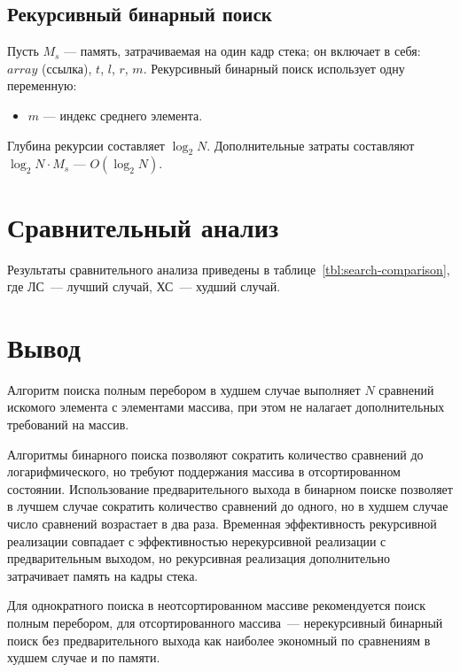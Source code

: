\subsection{Рекурсивный бинарный поиск}
Пусть $M_s$ --- память, затрачиваемая на один кадр стека; он включает в себя: $array$ (ссылка), $t$, $l$, $r$, $m$. 
Рекурсивный бинарный поиск использует одну переменную:
\begin{itemize}
	\item $m$ --- индекс среднего элемента.
\end{itemize}
Глубина рекурсии составляет $\log_2N$.
Дополнительные затраты составляют $\log_2N \cdot M_s$ --- $O(\log_2N)$.

\section{Сравнительный анализ}
Результаты сравнительного анализа приведены в таблице~\ref{tbl:search-comparison}, где ЛС~--- лучший случай, ХС~--- худший случай.

\section{Вывод}
Алгоритм поиска полным перебором в худшем случае выполняет $N$ сравнений искомого элемента с элементами массива, при этом не налагает дополнительных требований на массив. 

Алгоритмы бинарного поиска позволяют сократить количество сравнений до логарифмического, но требуют поддержания массива в отсортированном состоянии. Использование предварительного выхода в бинарном поиске позволяет в лучшем случае сократить количество сравнений до одного, но в худшем случае число сравнений возрастает в два раза. Временная эффективность рекурсивной реализации совпадает с эффективностью нерекурсивной реализации с предварительным выходом, но рекурсивная реализация дополнительно затрачивает память на кадры стека.

Для однократного поиска в неотсортированном массиве рекомендуется поиск полным перебором, для отсортированного массива~--- нерекурсивный бинарный поиск без предварительного выхода как наиболее экономный по сравнениям в худшем случае и по памяти.